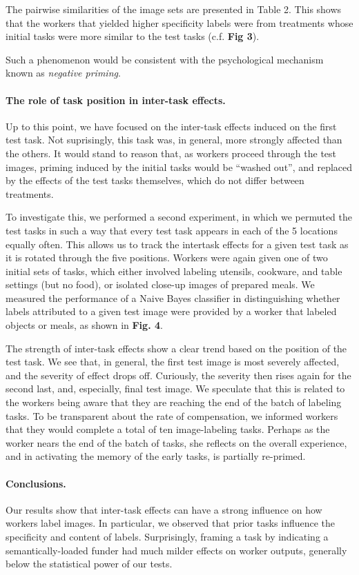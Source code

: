 \documentclass[12pt]{article}
\begin{document}
The pairwise similarities of the image sets are presented in Table 2. This 
shows that the workers that yielded higher specificity labels were from 
treatments whose initial tasks were more similar to the test tasks (c.f.
\textbf{Fig 3}).

Such a phenomenon would be consistent with the psychological mechanism known as
\textit{negative priming}.
\paragraph{The role of task position in inter-task effects.}
Up to this point, we have focused on the inter-task effects induced on 
the first test task.  Not suprisingly, this task was, in general, more 
strongly affected than the others.  It would stand to reason that, as workers 
proceed through the test images, priming induced by the initial tasks would
be ``washed out'', and replaced by the effects of the test tasks themselves,
which do not differ between treatments.

To investigate this, we performed a second experiment, in which we permuted
the test tasks in such a way that every test task appears in each of the
5 locations equally often.  This allows us to track the intertask effects for
a given test task as it is rotated through the five positions.  Workers were
again given one of two initial sets of tasks, which either involved labeling
utensils, cookware, and table settings (but no food), or isolated close-up
images of prepared meals.  We measured the performance of a Naive Bayes 
classifier in distinguishing whether labels attributed to a given test 
image were provided by a worker that labeled objects or meals, as shown in 
\textbf{Fig. 4}.

The strength of inter-task effects show a clear trend based on the position of
the test task.  We see that, in general, the first test image is most severely
affected, and the severity of effect drops off.  Curiously, the severity then
rises again for the second last, and, especially, final test image.  We 
speculate that this is related to the workers being aware that they are 
reaching the end of the batch of labeling tasks.  To be transparent about the
rate of compensation, we informed workers that they would complete a total
of ten image-labeling tasks.  Perhaps as the worker nears the end of the batch
of tasks, she reflects on the overall experience, and in activating the
memory of the early tasks, is partially re-primed.


\paragraph{Conclusions.}
Our results show that inter-task effects can have a strong influence on how 
workers label images. In particular, we observed that prior tasks influence 
the specificity and content of labels. Surprisingly, framing a task by 
indicating a semantically-loaded funder had much milder effects on worker 
outputs, generally below the statistical power of our tests.
\end{document}
